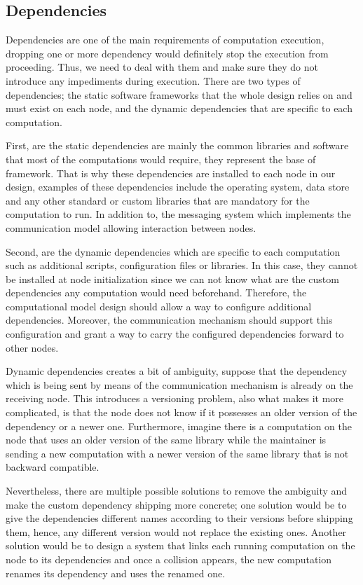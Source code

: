 \newpage


\subsection{Dependencies}

Dependencies are one of the main requirements of computation execution, dropping one or more dependency would definitely stop the execution from proceeding. Thus, we need to deal with them and make sure they do not introduce any impediments during execution.  There are two types of dependencies; the static software frameworks that the whole design relies on and must exist on each node, and the dynamic dependencies that are specific to each computation.

First, are the static dependencies are mainly the common libraries and software that most of the computations would require, they represent the base of framework. That is why these dependencies are installed to each node in our design, examples of these dependencies include the operating system, data store and any other standard or custom libraries that are mandatory for the computation to run. In addition to, the messaging system which implements the communication model allowing interaction between nodes. 

 Second, are the dynamic dependencies which are specific to each computation such as additional scripts, configuration files or libraries. In this case, they cannot be installed at node initialization since we can not know what are the custom dependencies any computation would need beforehand. Therefore, the computational model design should allow a way to configure additional dependencies. Moreover, the communication mechanism should support this configuration and grant a way to carry the configured dependencies forward to other nodes.
 
 
  Dynamic dependencies creates a bit of ambiguity, suppose that the dependency which is being sent by means of the communication mechanism is already on the receiving node. This introduces a  versioning problem, also what makes it more complicated, is that the node does not know if it possesses an older version of the dependency or a newer one. Furthermore,  imagine there is a computation on the node that uses an older version of the same library while the maintainer is sending a new computation with a newer version of the same library that is not backward compatible. 
  
   Nevertheless, there are multiple possible solutions to remove the ambiguity and make the custom dependency shipping more concrete; one solution would be to give the dependencies different names according to their versions before shipping them, hence, any different version would not replace the existing ones. Another solution would be to design a system that links each running computation on the node to its dependencies and once a collision appears, the new computation renames its dependency and uses the renamed one.
 

